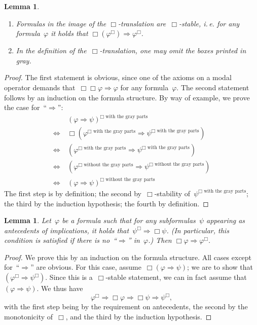 \documentclass[10pt]{amsart}
\makeatletter
\theoremstyle{definition}
\theoremstyle{plain}
\newtheorem{lemma}[defn]{Lemma}
\theoremstyle{remark}
\newcommand{\?}{\,{:}\,}
\renewcommand{\_}{\mathpunct{.}\,}
\newcommand{\ie}{i.\,e.\@\xspace}
\makeatother
\begin{document}
\begin{lemma}\begin{enumerate}
\item Formulas in the image of the $\Box$-translation are~$\Box$-stable,
\ie for any formula~$\varphi$ it holds that
$\Box(\varphi^\Box) \Longrightarrow \varphi^\Box$.
\item In the definition of the~$\Box$-translation, one may omit the boxes
printed in gray.
\end{enumerate}\end{lemma}
\begin{proof}The first statement is obvious, since one of the axioms on a modal
operator demands that~$\Box\Box\varphi \Rightarrow \varphi$ for any
formula~$\varphi$. The second statement follows by an induction on the
formula structure. By way of example, we prove the case for~``$\Rightarrow$'':
\newcommand{\withgray}{\text{$\Box$ with the gray parts}}
\newcommand{\withoutgray}{\text{$\Box$ without the gray parts}}
\begin{align*}
  &\ (\varphi \Rightarrow \psi)^\withgray \\
  \Longleftrightarrow &\ \Box(\varphi^\withgray \Rightarrow \psi^\withgray) \\
  \Longleftrightarrow &\ (\varphi^\withgray \Rightarrow \psi^\withgray) \\
  \Longleftrightarrow &\ (\varphi^\withoutgray \Rightarrow \psi^\withoutgray) \\
  \Longleftrightarrow &\ (\varphi \Rightarrow \psi)^\withoutgray
\end{align*}
The first step is by definition; the second by~$\Box$-stability
of~$\psi^\withgray$; the third by the induction hypothesis; the fourth by
definition.
\end{proof}

\begin{lemma}\label{lemma:open-stalk}
Let~$\varphi$ be a formula such that for any subformulas~$\psi$
appearing as antecedents of implications, it holds that~$\psi^\Box \Rightarrow
\Box\psi$. (In particular, this condition is satisfied if there is
no~``$\Rightarrow$'' in~$\varphi$.) Then $\Box\varphi \Rightarrow
\varphi^\Box$.\end{lemma}
\begin{proof}We prove this by an induction on the formula structure. All cases
except for~``$\Rightarrow$'' are obvious. For this case, assume~$\Box(\varphi
\Rightarrow \psi)$; we are to show that~$(\varphi^\Box \Rightarrow \psi^\Box)$.
Since this is a~$\Box$-stable statement, we can in fact assume that~$(\varphi
\Rightarrow \psi)$. We thus have
\[ \varphi^\Box \Longrightarrow \Box\varphi \Longrightarrow \Box\psi
\Longrightarrow \psi^\Box, \]
with the first step being by the requirement on antecedents, the second by the
monotonicity of~$\Box$, and the third by the induction hypothesis.
\end{proof}
\end{document}

